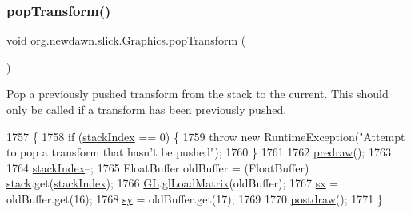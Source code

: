 \subsubsection{\texorpdfstring{pop\+Transform()}{popTransform()}}
{\footnotesize\ttfamily void org.\+newdawn.\+slick.\+Graphics.\+pop\+Transform (\begin{DoxyParamCaption}{ }\end{DoxyParamCaption})\hspace{0.3cm}{\ttfamily [inline]}}

Pop a previously pushed transform from the stack to the current. This should only be called if a transform has been previously pushed. 
\begin{DoxyCode}
1757                                \{
1758         \textcolor{keywordflow}{if} (\mbox{\hyperlink{classorg_1_1newdawn_1_1slick_1_1_graphics_a4049b6b7ef4980f4a8168172d76f2a12}{stackIndex}} == 0) \{
1759             \textcolor{keywordflow}{throw} \textcolor{keyword}{new} RuntimeException(\textcolor{stringliteral}{"Attempt to pop a transform that hasn't be pushed"});
1760         \}
1761         
1762         \mbox{\hyperlink{classorg_1_1newdawn_1_1slick_1_1_graphics_a7b4c203181e3b6302d51ed9b24596b8d}{predraw}}();
1763         
1764         \mbox{\hyperlink{classorg_1_1newdawn_1_1slick_1_1_graphics_a4049b6b7ef4980f4a8168172d76f2a12}{stackIndex}}--;
1765         FloatBuffer oldBuffer = (FloatBuffer) \mbox{\hyperlink{classorg_1_1newdawn_1_1slick_1_1_graphics_af86e114be4d3a01386d2f0dfa815cc20}{stack}}.get(\mbox{\hyperlink{classorg_1_1newdawn_1_1slick_1_1_graphics_a4049b6b7ef4980f4a8168172d76f2a12}{stackIndex}});
1766         \mbox{\hyperlink{classorg_1_1newdawn_1_1slick_1_1_graphics_a39ca68db81b225982a4421c4a6835eed}{GL}}.\mbox{\hyperlink{interfaceorg_1_1newdawn_1_1slick_1_1opengl_1_1renderer_1_1_s_g_l_a41baff345ccbf53de61ebb3c77e02914}{glLoadMatrix}}(oldBuffer);
1767         \mbox{\hyperlink{classorg_1_1newdawn_1_1slick_1_1_graphics_a4678c53357b785b1af9ea7a163f65dd1}{sx}} = oldBuffer.get(16);
1768         \mbox{\hyperlink{classorg_1_1newdawn_1_1slick_1_1_graphics_a8bf991be4929bf3257a80d0176c472a1}{sy}} = oldBuffer.get(17);
1769         
1770         \mbox{\hyperlink{classorg_1_1newdawn_1_1slick_1_1_graphics_abe054371d1486618ff327bbbcf02ff97}{postdraw}}();
1771     \}
\end{DoxyCode}
\mbox{\label{classorg_1_1newdawn_1_1slick_1_1_graphics_abe054371d1486618ff327bbbcf02ff97}} 
